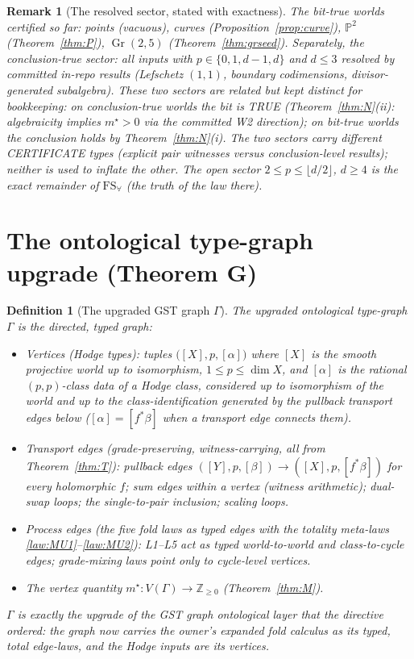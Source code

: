 \documentclass[11pt]{article}
\newtheorem{remark}[theorem]{Remark}
\newtheorem{definition}[theorem]{Definition}
\newcommand{\Z}{\mathbb{Z}}
\newcommand{\Pp}{\mathbb{P}}
\newcommand{\Gr}{\operatorname{Gr}}
\newcommand{\FS}{\mathrm{FS}_\forall}
\begin{document}
\begin{remark}[The resolved sector, stated with exactness]
\label{rem:resolved}
The \emph{bit-true} worlds certified so far: points (vacuous), curves
(Proposition~\ref{prop:curve}), $\Pp^2$ (Theorem~\ref{thm:P}),
$\Gr(2,5)$ (Theorem~\ref{thm:grseed}).  Separately, the
\emph{conclusion-true} sector: all inputs with $p\in\{0,1,d-1,d\}$ and
$d\le3$ resolved by committed in-repo results (Lefschetz $(1,1)$,
boundary codimensions, divisor-generated subalgebra).  These two sectors are
related but kept distinct for bookkeeping: on conclusion-true worlds the
bit is TRUE (Theorem~\ref{thm:N}(ii): algebraicity implies $m^\star>0$ via
the committed W2 direction); on bit-true worlds the conclusion holds by
Theorem~\ref{thm:N}(i).  The two sectors carry different CERTIFICATE types
(explicit pair witnesses versus conclusion-level results); neither is used to
inflate the other.  The open sector $2\le p\le\lfloor d/2\rfloor$,
$d\ge4$ is the exact remainder of $\FS$ (the truth of the law there).
\end{remark}

\section{The ontological type-graph upgrade (Theorem G)}
\label{sec:ontology}

\begin{definition}[The upgraded GST graph $\Gamma$]
\label{def:gamma}
The \emph{upgraded ontological type-graph} $\Gamma$ is the directed,
typed graph:
\begin{itemize}
\item \emph{Vertices} (Hodge types): tuples
$\bigl([X],p,[\alpha]\bigr)$ where $[X]$ is the smooth projective world up
to isomorphism, $1\le p\le\dim X$, and $[\alpha]$ is the rational
$(p,p)$-class data of a Hodge class, considered up to isomorphism of the
world and up to the class-identification generated by the pullback transport
edges below ($[\alpha]=[f^*\beta]$ when a transport edge connects them).
\item \emph{Transport edges} (grade-preserving, witness-carrying, all from
Theorem~\ref{thm:T}): pullback edges
$([Y],p,[\beta])\to([X],p,[f^*\beta])$ for every holomorphic $f$;
sum edges within a vertex (witness arithmetic); dual-swap loops; the
single-to-pair inclusion; scaling loops.
\item \emph{Process edges} (the five fold laws as typed edges with the
totality meta-laws \ref{law:MU1}--\ref{law:MU2}): L1--L5 act as typed
world-to-world and class-to-cycle edges; grade-mixing laws point only to
cycle-level vertices.
\item \emph{The vertex quantity} $m^\star\colon V(\Gamma)\to\Z_{\ge0}$
(Theorem~\ref{thm:M}).
\end{itemize}
$\Gamma$ is exactly the upgrade of the GST graph ontological layer that the
directive ordered: the graph now carries the owner's expanded fold calculus
as its typed, total edge-laws, and the Hodge inputs are its vertices.
\end{definition}
\end{document}
